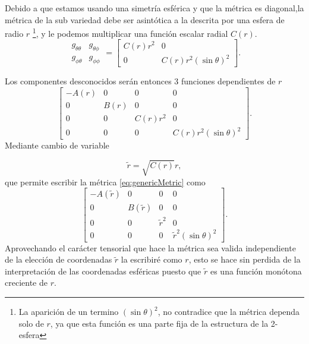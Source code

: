 Debido a que estamos usando una simetría esférica y que la métrica es diagonal,la métrica de la sub variedad debe ser asintótica a la descrita por una esfera de radio $r$ \footnote{La aparición de un termino $(\sin \theta)^2$, no contradice que la métrica dependa solo de $r$, ya que esta función es una parte fija de la estructura de la 2-esfera}, y le podemos multiplicar una función  escalar radial $C(r)$.
\begin{equation}
    \begin{array}{ll}
        g_{\theta \theta} & g_{\theta \phi} \\
        g_{\phi \theta}   & g_{\phi \phi}
    \end{array} = \left[\begin{array}{cc}
            C(r) r^2 & 0                       \\
            0        & C(r) r^2(\sin \theta)^2
        \end{array}\right].
\end{equation}


Los componentes desconocidos serán entonces 3 funciones dependientes de $r$
\begin{equation}
    \left[\begin{array}{cccc}
            -A(r) & 0    & 0        & 0                       \\
            0     & B(r) & 0        & 0                       \\
            0     & 0    & C(r) r^2 & 0                       \\
            0     & 0    & 0        & C(r) r^2(\sin \theta)^2
        \end{array}\right].
        \label{eq:genericMetric}
\end{equation}
Mediante cambio de variable 

\begin{equation}
    \tilde{r}=\sqrt{C(r)}  r,
\end{equation}
que permite escribir la métrica \ref{eq:genericMetric} como 
\begin{equation}
    \left[\begin{array}{cccc}
            -A(\tilde{r}) & 0    & 0        & 0                       \\
            0     & B(\tilde{r}) & 0        & 0                       \\
            0     & 0    & \tilde{r}^2 & 0                       \\
            0     & 0    & 0        & \tilde{r}^2(\sin \theta)^2
        \end{array}\right].
        \label{eq:genericmetric2}
\end{equation}
Aprovechando el carácter tensorial que hace la métrica sea valida independiente de la elección de coordenadas  $\tilde{r}$ la escribiré como $r$, esto se hace sin perdida de la interpretación de las coordenadas esféricas puesto que $\tilde{r}$ es una función monótona creciente de $r$.


